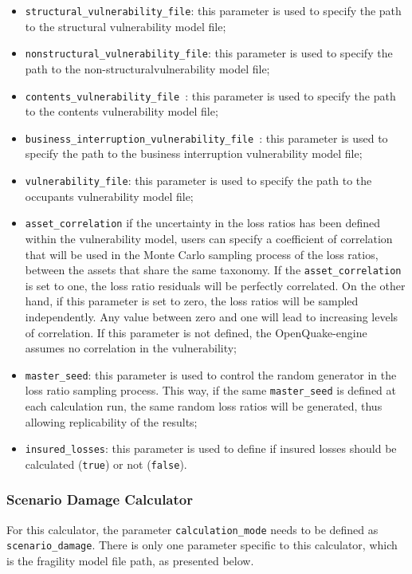 \begin{itemize}
\item  \Verb+structural_vulnerability_file+: this parameter is used to specify the path to the structural \gls{vulnerability model} file;
\item  \Verb+nonstructural_vulnerability_file+: this parameter is used to specify the path to the non-structural\gls{vulnerability model} file;
\item  \Verb+contents_vulnerability_file +: this parameter is used to specify the path to the contents \gls{vulnerability model} file;
\item  \Verb+business_interruption_vulnerability_file +: this parameter is used to specify the path to the business interruption \gls{vulnerability model} file;
\item  \Verb+vulnerability_file+: this parameter is used to specify the path to the occupants \gls{vulnerability model} file;
\item \texttt{asset\_cor\-re\-la\-tion} if the uncertainty in the loss ratios has been defined within the \gls{vulnerability model}, users can specify a coefficient of correlation that will be used in the Monte Carlo sampling process of the loss ratios, between the assets that share the same \gls{taxonomy}. If the \texttt{asset\_cor\-re\-la\-tion} is set to one, the loss ratio residuals will be perfectly correlated. On the other hand, if this parameter is set to zero, the loss ratios will be sampled independently. Any value between zero and one will lead to increasing levels of correlation. If this parameter is not defined, the OpenQuake-engine assumes no correlation in the vulnerability;
\item  \Verb+master_seed+: this parameter is used to control the random generator in the loss ratio sampling process. This way, if the same \Verb+master_seed+ is defined at each calculation run, the same random loss ratios will be generated, thus allowing replicability of the results;
\item  \Verb+insured_losses+: this parameter is used to define if insured losses should be calculated (\Verb+true+) or not (\Verb+false+).
\end{itemize}

\subsubsection{Scenario Damage Calculator}
For this calculator, the parameter \Verb+calculation_mode+ needs to be defined as \Verb+scenario_damage+. There is only one parameter specific to this calculator, which is the \gls{fragility model} file path, as presented below.

